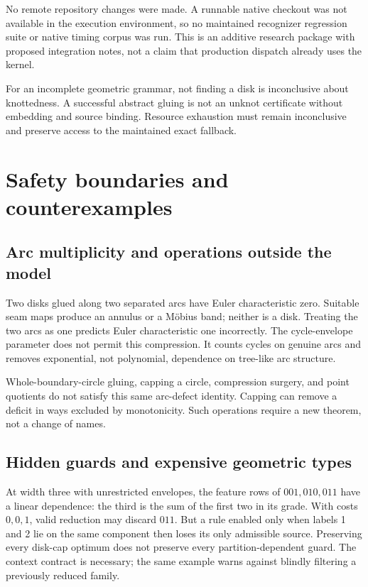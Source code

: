 \documentclass[11pt,a4paper]{article}
\theoremstyle{definition}
\theoremstyle{remark}
\begin{document}
No remote repository changes were made. A runnable native checkout was not available in
the execution environment, so no maintained recognizer regression suite or native timing
corpus was run. This is an additive research package with proposed integration notes,
not a claim that production dispatch already uses the kernel.

For an incomplete geometric grammar, not finding a disk is inconclusive about knottedness.
A successful abstract gluing is not an unknot certificate without embedding and source
binding. Resource exhaustion must remain inconclusive and preserve access to the
maintained exact fallback.

\section{Safety boundaries and counterexamples}\label{sec:safety}
\subsection{Arc multiplicity and operations outside the model}
Two disks glued along two separated arcs have Euler characteristic zero. Suitable seam
maps produce an annulus or a M\"obius band; neither is a disk. Treating the two arcs as
one predicts Euler characteristic one incorrectly. The cycle-envelope parameter does
not permit this compression. It counts cycles on genuine arcs and removes exponential,
not polynomial, dependence on tree-like arc structure.

Whole-boundary-circle gluing, capping a circle, compression surgery, and point quotients
do not satisfy this same arc-defect identity. Capping can remove a deficit in ways
excluded by monotonicity. Such operations require a new theorem, not a change of names.

\subsection{Hidden guards and expensive geometric types}
At width three with unrestricted envelopes, the feature rows of $001,010,011$ have a
linear dependence: the third is the sum of the first two in its grade. With costs
$0,0,1$, valid reduction may discard $011$. But a rule enabled only when labels 1 and 2
lie on the same component then loses its only admissible source. Preserving every disk-cap
optimum does not preserve every partition-dependent guard. The context contract is
necessary; the same example warns against blindly filtering a previously reduced family.
\end{document}
